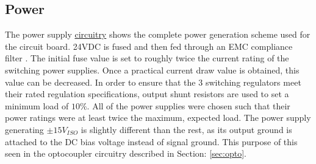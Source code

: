 \subsection {Power}

The power supply \hyperlink{sch:Power}{circuitry} shows the complete power generation scheme used for the circuit board. 24VDC is fused and then fed through an EMC compliance filter \cite{5VswitchDatasheet}. The initial fuse value is set to roughly twice the current rating of the switching power supplies. Once a practical current draw value is obtained, this value can be decreased. In order to ensure that the 3 switching regulators meet their rated regulation specifications, output shunt resistors are used to set a minimum load of $10\%$. All of the power supplies were chosen such that their power ratings were at least twice the maximum, expected load. The power supply generating $\pm 15V_{ISO}$ is slightly different than the rest, as its output ground is attached to the DC bias voltage instead of signal ground. This purpose of this seen in the optocoupler circuitry described in Section: \ref{sec:opto}.  

